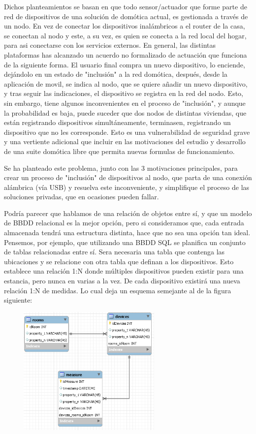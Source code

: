 Dichos planteamientos se basan en que todo sensor/actuador que forme parte de red de dispositivos de una solución de domótica actual, es gestionada a través de un nodo. En vez de conectar los dispositivos inalámbricos a el router de la casa, se conectan al nodo y este, a su vez, es quien se conecta a la red local del hogar, para asi conectarse con los servicios externos. En general, las distintas plataformas has alcanzado un acuerdo no formalizado de actuación que funciona de la siguiente forma. El usuario final compra un nuevo dispositivo, lo enciende, dejándolo en un estado de "inclusión" a la red domótica, después, desde la aplicación de movil, se indica al nodo, que se quiere añadir un nuevo dispositivo, y tras seguir las indicaciones, el dispositivo se registra en la red del nodo. Esto, sin embargo, tiene algunos inconvenientes en el proceso de "inclusión", y aunque la probabilidad es baja, puede suceder que dos nodos de distintas viviendas, que están registrando dispositivos simultáneamente, terminasen, registrando un dispositivo que no les corresponde. Esto es una vulnerabilidad de seguridad grave y una vertiente adicional que incluir en las motivaciones del estudio y desarrollo de una suite domótica libre que permita nuevas formulas de funcionamiento.

Se ha planteado este problema, junto con las 3 motivaciones principales, para crear un proceso de "inclusión" de dispositivos al nodo, que parta de una conexión alámbrica (vía USB) y resuelva este inconveniente, y simplifique el proceso de las soluciones privadas, que en ocasiones pueden fallar.

Podría parecer que hablamos de una relación de objetos entre sí, y que un modelo de BBDD relacional es la mejor opción, pero si consideramos que, cada entrada almacenada tendrá una estructura distinta, hace que no sea una opción tan ideal. Pensemos, por ejemplo, que utilizando una BBDD SQL se planifica un conjunto de tablas relacionadas entre sí. Sera necesaria una tabla que contenga las ubicaciones y se relacione con otra tabla que definan a los dispositivos. Esto establece una relación 1:N donde múltiples dispositivos pueden existir para una estancia, pero nunca en varias a la vez. De cada dispositivo existirá una nueva relación 1:N de medidas. Lo cual deja un esquema semejante al de la figura siguiente:


\begin{figure}[hbt!]
\centering
\includegraphics[height=2.5in]{figures/SQLSchemaExample_1.png}
\end{figure}

